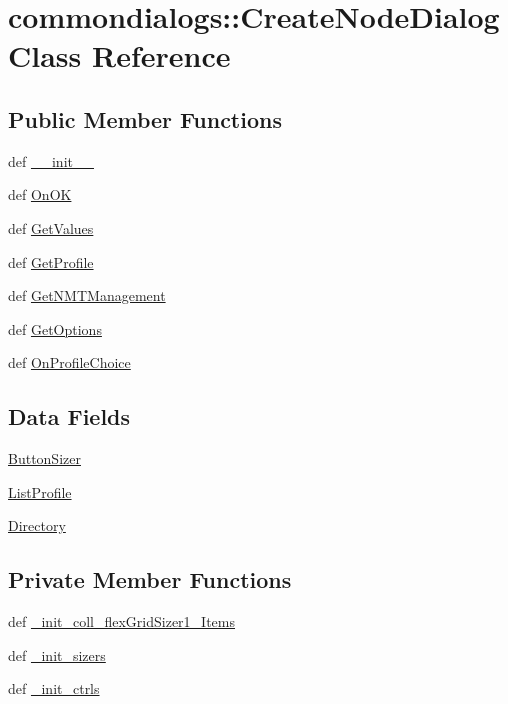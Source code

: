 \hypertarget{classcommondialogs_1_1CreateNodeDialog}{
\section{commondialogs::Create\-Node\-Dialog Class Reference}
\label{classcommondialogs_1_1CreateNodeDialog}
}
\subsection*{Public Member Functions}
\begin{CompactItemize}
\item 
def \hyperlink{classcommondialogs_1_1CreateNodeDialog_58c8aa89d480669890ef63456d126705}{\_\-\_\-init\_\-\_\-}
\item 
def \hyperlink{classcommondialogs_1_1CreateNodeDialog_1099b975b697d76a4a7ecdaef82b7f60}{On\-OK}
\item 
def \hyperlink{classcommondialogs_1_1CreateNodeDialog_f62fdd3d1fbbea86a3eb716f20341b49}{Get\-Values}
\item 
def \hyperlink{classcommondialogs_1_1CreateNodeDialog_2329fe0564d06a39130520ba83a22caf}{Get\-Profile}
\item 
def \hyperlink{classcommondialogs_1_1CreateNodeDialog_e224099d30206d623fcc567101b613d6}{Get\-NMTManagement}
\item 
def \hyperlink{classcommondialogs_1_1CreateNodeDialog_02ed8598e287a76055b4524fbf56278d}{Get\-Options}
\item 
def \hyperlink{classcommondialogs_1_1CreateNodeDialog_145fc2276fd439e7d4bca53aff3a467a}{On\-Profile\-Choice}
\end{CompactItemize}
\subsection*{Data Fields}
\begin{CompactItemize}
\item 
\hyperlink{classcommondialogs_1_1CreateNodeDialog_7a8dc1f8cd4b452dbba2203499aad52c}{Button\-Sizer}
\item 
\hyperlink{classcommondialogs_1_1CreateNodeDialog_a5b092c98d3fd4ea4cdffa4d48150ac4}{List\-Profile}
\item 
\hyperlink{classcommondialogs_1_1CreateNodeDialog_37780e6f4737ffa27ff08bc4de64711c}{Directory}
\end{CompactItemize}
\subsection*{Private Member Functions}
\begin{CompactItemize}
\item 
def \hyperlink{classcommondialogs_1_1CreateNodeDialog_39d47edefb6b24dc8ad6ffa12d3d1bef}{\_\-init\_\-coll\_\-flex\-Grid\-Sizer1\_\-Items}
\item 
def \hyperlink{classcommondialogs_1_1CreateNodeDialog_f071ab5e59b63ec2712cd90dc90ac61a}{\_\-init\_\-sizers}
\item 
def \hyperlink{classcommondialogs_1_1CreateNodeDialog_429fa9f55c65a135c19b01222b58d797}{\_\-init\_\-ctrls}
\end{CompactItemize}


